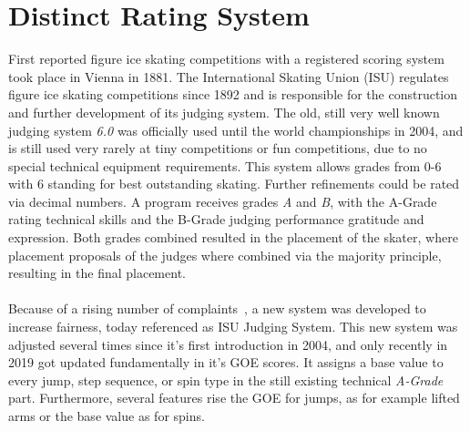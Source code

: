 %



\section{Distinct Rating System}
First reported figure ice skating competitions with a registered scoring system took place in Vienna in 1881.
The International Skating Union (ISU) regulates figure ice skating competitions since 1892 and is responsible for the
construction
and further development of its judging system.
The old, still very well known judging system \textit{6.0} was officially used until the world championships in 2004,
and
is still used very rarely at tiny competitions or fun competitions, due to no special technical equipment requirements.
This system allows grades from 0-6 with 6 standing for best outstanding skating.
Further refinements could be rated via decimal numbers.
A program receives grades \textit{A} and \textit{B}, with the A-Grade rating technical skills and the B-Grade judging
performance gratitude and expression.
Both grades combined resulted in the placement of the skater, where placement proposals of the judges where combined via
the majority principle, resulting in the final placement.
\\\mbox{}\\
Because of a rising number of complaints~\cite{unfairjudge}, a new system was developed to increase fairness, today
referenced as ISU
Judging System.
This new system was adjusted several times since it's first introduction in 2004, and only recently in 2019 got updated
fundamentally in it's GOE scores.
It assigns a base value to every jump, step sequence, or spin type in the still existing technical \textit{A-Grade}
part.
Furthermore, several features rise the GOE for jumps, as for example lifted arms or the base value as for spins.
